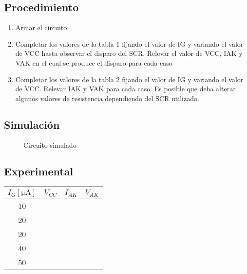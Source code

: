 \subsection{Procedimiento}
\begin{enumerate}
  \item Armar el circuito.
  \item Completar los valores de la tabla 1 fijando el valor de IG y variando el valor
        de VCC hasta observar el disparo del SCR. Relevar el valor de VCC, IAK y VAK
        en el cual se produce el disparo para cada caso 
  \item Completar los valores de la tabla 2 fijando el valor de IG y variando el valor
        de VCC. Relevar IAK y VAK para cada caso. Es posible que deba alterar
        algunos valores de resistencia dependiendo del SCR utilizado.
\end{enumerate}
\subsection{Simulación}
  \begin{figure}[H]
    \begin{center}
    \end{center}
    \caption{Circuito simulado}
    \label{fig:CircuitoPrimeraParte}
  \end{figure}
  \begin{center}
  \end{center}
  \subsection{Experimental}
  \begin{table}[H]
    \begin{center}
      \begin{tabular}{c|c|c|c}
        $I_{G}[\unit{\micro\ampere}]$ &$V_{CC}$ &$I_{AK}$ &$V_{AK}$ \\
        \hline
        10 &   &   & \\
        20 &   &   & \\
        20 &   &   & \\
        40 &   &   & \\
        50 &   &   & \\
      \end{tabular}
    \end{center} 
  \end{table}

